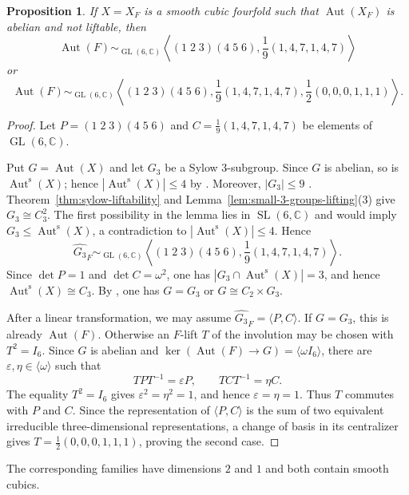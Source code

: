 \documentclass[12pt]{amsart}
\numberwithin{equation}{section}
\theoremstyle{plain}
\newtheorem{prop}[thm]{Proposition}
\theoremstyle{definition}
\theoremstyle{remark}
\newcommand{\CC}{\mathbb C}
\DeclareMathOperator{\Aut}{Aut}
\DeclareMathOperator{\GL}{GL}
\DeclareMathOperator{\SL}{SL}
\newcommand{\Auts}{\Aut^{\mathrm s}}
\begin{document}
\begin{prop}
    If $X=X_F$ is a smooth cubic fourfold such that $\Aut(X_F)$ is abelian
    and not liftable, then
    \[
    \Aut(F)\sim_{\GL(6,\CC)} \left\langle (1\;2\;3)(4\;5\;6),\frac{1}{9}(1,4,7,1,4,7)\right\rangle
    \]
    or
    \[
    \Aut(F)\sim_{\GL(6,\CC)} \left\langle (1\;2\;3)(4\;5\;6),\frac{1}{9}(1,4,7,1,4,7),\frac{1}{2}(0,0,0,1,1,1)\right\rangle.
    \]
\end{prop}
\begin{proof}
    Let $P=(1\;2\;3)(4\;5\;6)$ and
    $C=\frac19(1,4,7,1,4,7)$ be elements of $\GL(6,\CC)$.

    Put $G=\Aut(X)$ and let $G_3$ be a Sylow $3$-subgroup.  Since $G$ is
    abelian, so is $\Auts(X)$; hence
    $|\Auts(X)|\leq4$ by \cite[Theorem~1.2]{laza2022automorphisms}.  Moreover,
    $|G_3|\leq9$
    \cite[Proposition~5.1]{FWZ26}.  Theorem~\ref{thm:sylow-liftability} and
    Lemma~\ref{lem:small-3-groups-lifting}(3) give $G_3\cong C_3^2$.
    The first possibility in the lemma lies in $\SL(6,\CC)$ and would imply
    $G_3\leq\Auts(X)$, a contradiction to $|\Auts(X)|\leq4$. Hence
    \[
    \widehat{G_3}_F\sim_{\GL(6,\CC)}
    \left\langle (1\;2\;3)(4\;5\;6),\frac19(1,4,7,1,4,7)\right\rangle.
    \]
    Since $\det P=1$ and $\det C=\omega^2$, one has
    $|G_3\cap\Auts(X)|=3$, and hence $\Auts(X)\cong C_3$.  By
    \cite[Theorems~3 and~4]{mayanskiy2013abelianautomorphismgroupscubic},
    one has $G=G_3$ or $G\cong C_2\times G_3$.

    After a linear transformation, we may assume
    $\widehat{G_3}_F=\langle P,C\rangle$.  If $G=G_3$, this is already
    $\Aut(F)$.  Otherwise an $F$-lift $T$ of the involution may be chosen
    with $T^2=I_6$.  Since $G$ is abelian and
    $\ker(\Aut(F)\to G)=\langle\omega I_6\rangle$, there are
    $\varepsilon,\eta\in\langle\omega\rangle$ such
    that
    \[
    TPT^{-1}=\varepsilon P,\qquad TCT^{-1}=\eta C.
    \]
    The equality $T^2=I_6$ gives $\varepsilon^2=\eta^2=1$, and hence
    $\varepsilon=\eta=1$.  Thus $T$ commutes with $P$ and $C$.  Since the
    representation of $\langle P,C\rangle$ is the
    sum of two equivalent irreducible three-dimensional representations, a
    change of basis in its centralizer gives
    $T=\frac12(0,0,0,1,1,1)$, proving the second case.

\end{proof}

The corresponding families have dimensions $2$ and $1$ and both contain
smooth cubics.
\end{document}
